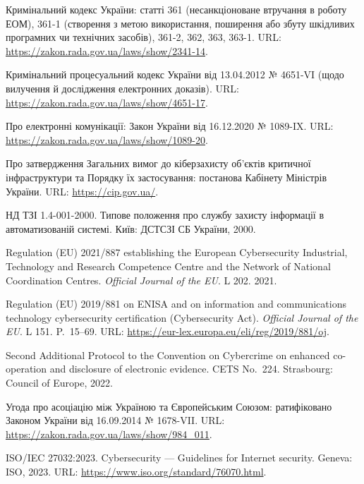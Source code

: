 
 Кримінальний кодекс України: статті 361 (несанкціоноване втручання в роботу ЕОМ), 361-1 (створення з метою використання, поширення або збуту шкідливих програмних чи технічних засобів), 361-2, 362, 363, 363-1. URL: \url{https://zakon.rada.gov.ua/laws/show/2341-14}.

 Кримінальний процесуальний кодекс України від 13.04.2012 № 4651-VI (щодо вилучення й дослідження електронних доказів). URL: \url{https://zakon.rada.gov.ua/laws/show/4651-17}.

 Про електронні комунікації: Закон України від 16.12.2020 № 1089-IX. URL: \url{https://zakon.rada.gov.ua/laws/show/1089-20}.

 Про затвердження Загальних вимог до кіберзахисту об'єктів критичної інфраструктури та Порядку їх застосування: постанова Кабінету Міністрів України. URL: \url{https://cip.gov.ua/}.

 НД ТЗІ 1.4-001-2000. Типове положення про службу захисту інформації в автоматизованій системі. Київ: ДСТСЗІ СБ України, 2000.

 Regulation (EU) 2021/887 establishing the European Cybersecurity Industrial, Technology and Research Competence Centre and the Network of National Coordination Centres. \emph{Official Journal of the EU}. L 202. 2021.

 Regulation (EU) 2019/881 on ENISA and on information and communications technology cybersecurity certification (Cybersecurity Act). \emph{Official Journal of the EU}. L 151. P.~15--69. URL: \url{https://eur-lex.europa.eu/eli/reg/2019/881/oj}.

 Second Additional Protocol to the Convention on Cybercrime on enhanced co-operation and disclosure of electronic evidence. CETS No.~224. Strasbourg: Council of Europe, 2022.

 Угода про асоціацію між Україною та Європейським Союзом: ратифіковано Законом України від 16.09.2014 № 1678-VII. URL: \url{https://zakon.rada.gov.ua/laws/show/984_011}.

 ISO/IEC 27032:2023. Cybersecurity --- Guidelines for Internet security. Geneva: ISO, 2023. URL: \url{https://www.iso.org/standard/76070.html}.

